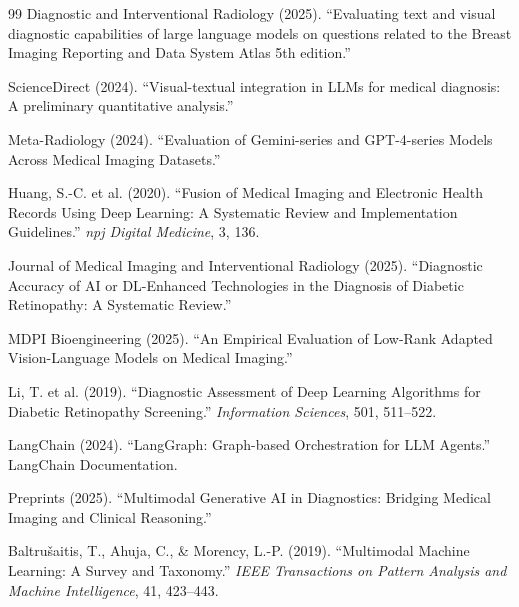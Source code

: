 \documentclass[11pt,a4paper]{article}
\begin{document}
\begin{thebibliography}{99}
Diagnostic and Interventional Radiology (2025). ``Evaluating text and visual diagnostic capabilities of large language models on questions related to the Breast Imaging Reporting and Data System Atlas 5th edition.''

ScienceDirect (2024). ``Visual-textual integration in LLMs for medical diagnosis: A preliminary quantitative analysis.''

Meta-Radiology (2024). ``Evaluation of Gemini-series and GPT-4-series Models Across Medical Imaging Datasets.''

Huang, S.-C. et al. (2020). ``Fusion of Medical Imaging and Electronic Health Records Using Deep Learning: A Systematic Review and Implementation Guidelines.'' \textit{npj Digital Medicine}, 3, 136.

Journal of Medical Imaging and Interventional Radiology (2025). ``Diagnostic Accuracy of AI or DL-Enhanced Technologies in the Diagnosis of Diabetic Retinopathy: A Systematic Review.''

MDPI Bioengineering (2025). ``An Empirical Evaluation of Low-Rank Adapted Vision-Language Models on Medical Imaging.''

Li, T. et al. (2019). ``Diagnostic Assessment of Deep Learning Algorithms for Diabetic Retinopathy Screening.'' \textit{Information Sciences}, 501, 511--522.

LangChain (2024). ``LangGraph: Graph-based Orchestration for LLM Agents.'' LangChain Documentation.

Preprints (2025). ``Multimodal Generative AI in Diagnostics: Bridging Medical Imaging and Clinical Reasoning.''

Baltru{\v{s}}aitis, T., Ahuja, C., \& Morency, L.-P. (2019). ``Multimodal Machine Learning: A Survey and Taxonomy.'' \textit{IEEE Transactions on Pattern Analysis and Machine Intelligence}, 41, 423--443.

\end{thebibliography}
\end{document}
